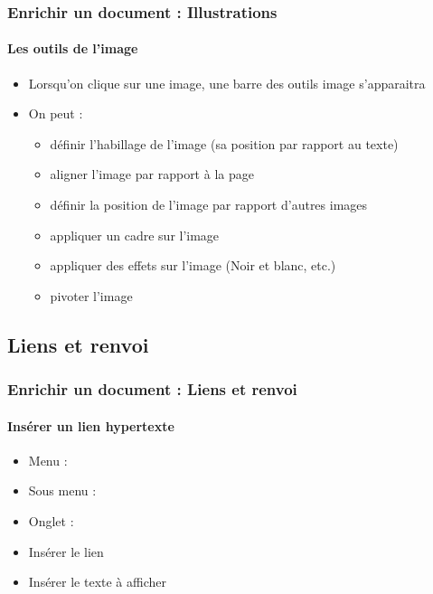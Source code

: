 \documentclass[xcolor=table]{beamer}
\begin{document}
\begin{frame}[t]
\frametitle{Enrichir un document : Illustrations}
\framesubtitle{Les outils de l'image}


\begin{itemize}
	\item Lorsqu'on clique sur une image, une barre des outils image s'apparaitra
	\item On peut : 
	\begin{itemize}
		\item définir l'habillage de l'image (sa position par rapport au texte)
		\item aligner l'image par rapport à la page
		\item définir la position de l'image par rapport d'autres images
		\item appliquer un cadre sur l'image
		\item appliquer des effets sur l'image (Noir et blanc, etc.) 
		\item pivoter l'image
	\end{itemize}
\end{itemize}

\end{frame}

\subsection{Liens et renvoi}

\begin{frame}[t]
\frametitle{Enrichir un document : Liens et renvoi}
\framesubtitle{Insérer un lien hypertexte}

\begin{minipage}{0.38\textwidth}
	\begin{itemize}
		\item Menu : 
		\item Sous menu : 
		\item Onglet : 
		\item Insérer le lien
		\item Insérer le texte à afficher
	\end{itemize}
\end{minipage}
\begin{minipage}{0.6\textwidth}	
\end{minipage}

\end{frame}
\end{document}
